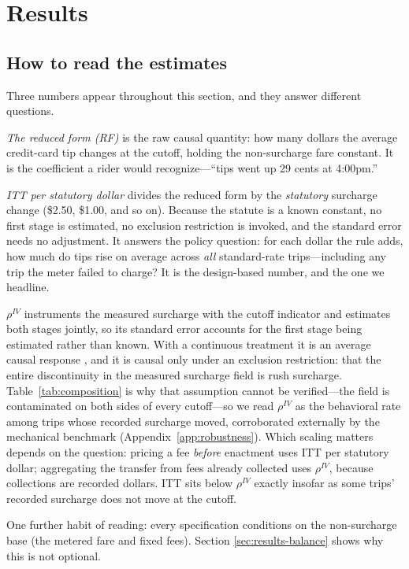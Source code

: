 \section{Results}
\label{sec:results}

\subsection{How to read the estimates}
\label{sec:results-read}
Three numbers appear throughout this section, and they answer different
questions.

\emph{The reduced form (RF)} is the raw causal quantity: how many
dollars the average credit-card tip changes at the cutoff, holding the
non-surcharge fare constant. It is the coefficient a rider would
recognize---``tips went up 29 cents at 4:00pm.''

\emph{ITT per statutory dollar} divides the reduced form by the
\emph{statutory} surcharge change (\$2.50, \$1.00, and so on). Because
the statute is a known constant, no first stage is estimated, no
exclusion restriction is invoked, and the standard error needs no
adjustment. It answers the policy question: for each dollar the rule
adds, how much do tips rise on average across \emph{all} standard-rate
trips---including any trip the meter failed to charge? It is the
design-based number, and the one we headline.

\emph{$\rho^{IV}$} instruments the measured surcharge with the cutoff
indicator and estimates both stages jointly, so its standard error
accounts for the first stage being estimated rather than known. With a
continuous treatment it is an average causal response
\parencite{angrist1995two}, and it is causal only under an exclusion
restriction: that the entire discontinuity in the measured surcharge
field is rush surcharge. Table~\ref{tab:composition} is why that
assumption cannot be verified---the field is contaminated on both
sides of every cutoff---so we read $\rho^{IV}$ as the behavioral rate
among trips whose recorded surcharge moved, corroborated externally by
the mechanical benchmark (Appendix~\ref{app:robustness}). Which scaling
matters depends on the question: pricing a fee \emph{before} enactment
uses ITT per statutory dollar; aggregating the transfer from fees
already collected uses $\rho^{IV}$, because collections are recorded
dollars. ITT sits below $\rho^{IV}$ exactly insofar as some trips'
recorded surcharge does not move at the cutoff.

One further habit of reading: every specification conditions on the
non-surcharge base (the metered fare and fixed fees). Section
\ref{sec:results-balance} shows why this is not optional.

